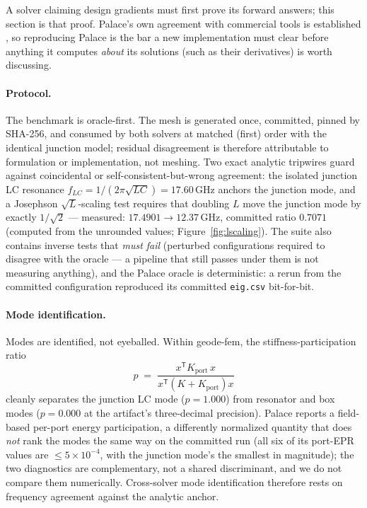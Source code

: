 \documentclass{anvil-paper}
\begin{document}
A solver claiming design gradients must first prove its forward answers;
this section is that proof. Palace's own agreement with commercial tools
is established \citep{sommers2025open}, so reproducing Palace is the bar
a new implementation must clear before anything it computes \emph{about}
its solutions (such as their derivatives) is worth discussing.

\paragraph{Protocol.}
The benchmark is oracle-first. The mesh is generated once, committed,
pinned by SHA-256, and consumed by both solvers at matched (first) order
with the identical junction model; residual disagreement is therefore
attributable to formulation or implementation, not meshing. Two exact
analytic tripwires guard against coincidental or
self-consistent-but-wrong agreement: the isolated junction LC resonance
$f_{LC} = 1/(2\pi\sqrt{LC}) = 17.60$\,GHz anchors the junction mode, and
a Josephson $\sqrt{L}$-scaling test requires that doubling $L$ move the
junction mode by exactly $1/\sqrt{2}$ --- measured: $17.4901 \to
12.37$\,GHz, committed ratio $0.7071$ (computed from the unrounded
values; Figure~\ref{fig:lscaling}). The suite also contains inverse tests
that \emph{must fail} (perturbed configurations required to disagree with
the oracle --- a pipeline that still passes under them is not measuring
anything), and the Palace oracle is deterministic: a rerun from the
committed configuration reproduced its committed \texttt{eig.csv}
bit-for-bit.

\paragraph{Mode identification.}
Modes are identified, not eyeballed. Within geode-fem, the
stiffness-participation ratio
\begin{equation}
  p \;=\; \frac{x^{\mathsf{T}} K_{\mathrm{port}}\, x}
               {x^{\mathsf{T}} \left(K + K_{\mathrm{port}}\right) x}
  \label{eq:participation}
\end{equation}
cleanly separates the junction LC mode ($p = 1.000$) from resonator and
box modes ($p = 0.000$ at the artifact's three-decimal precision). Palace
reports a field-based per-port energy participation, a differently
normalized quantity that does \emph{not} rank the modes the same way on
the committed run (all six of its port-EPR values are $\leq
5\times10^{-4}$, with the junction mode's the smallest in magnitude); the
two diagnostics are complementary, not a shared discriminant, and we do
not compare them numerically. Cross-solver mode identification therefore
rests on frequency agreement against the analytic anchor.
\end{document}
